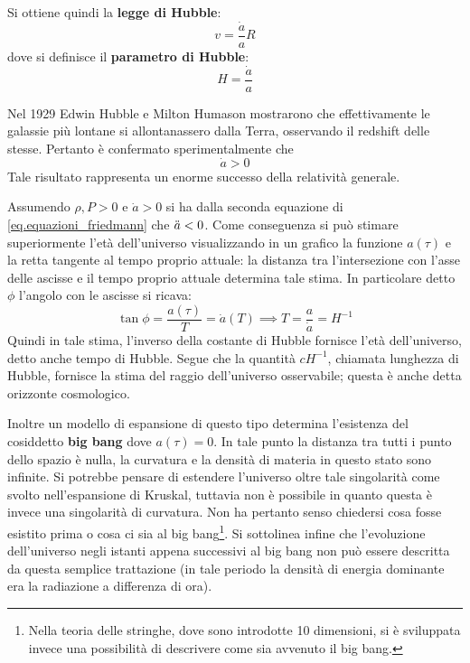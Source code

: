 Si ottiene quindi la \textbf{legge di Hubble}:
\begin{equation}
    v = \frac{\Dot{a}}{a} R
    \label{eq.legge_hubble}
\end{equation}
dove si definisce il \textbf{parametro di Hubble}:
\begin{equation*}
    H=  \frac{\Dot{a}}{a}
\end{equation*}

Nel 1929 Edwin Hubble e Milton Humason mostrarono che effettivamente le galassie più lontane si allontanassero dalla Terra, osservando il redshift delle stesse. Pertanto è confermato sperimentalmente che
\begin{equation*}
    \Dot{a} > 0
\end{equation*}
Tale risultato rappresenta un enorme successo della relatività generale.

Assumendo $\rho, P >0$ e $\Dot{a}>0$ si ha dalla seconda equazione di \ref{eq.equazioni_friedmann} che $\Ddot{a}<0$. Come conseguenza si può stimare superiormente l'età dell'universo visualizzando in un grafico la funzione $a(\tau)$ e la retta tangente al tempo proprio attuale: la distanza tra l'intersezione con l'asse delle ascisse e il tempo proprio attuale determina tale stima.
In particolare detto $\phi$ l'angolo con le ascisse si ricava:
\begin{equation*}
    \tan \phi = \frac{a(\tau)}{T}= \Dot{a}(T) \implies T= \frac{a}{\dot{a}} = H^{-1}
\end{equation*}
Quindi in tale stima, l'inverso della costante di Hubble fornisce l'età dell'universo, detto anche tempo di Hubble. Segue che la quantità $cH^{-1}$, chiamata lunghezza di Hubble, fornisce la stima del raggio dell'universo osservabile; questa è anche detta orizzonte cosmologico.

Inoltre un modello di espansione di questo tipo determina l'esistenza del cosiddetto \textbf{big bang} dove $a(\tau)=0$. In tale punto la distanza tra tutti i punto dello spazio è nulla, la curvatura e la densità di materia in questo stato sono infinite. Si potrebbe pensare di estendere l'universo oltre tale singolarità come svolto nell'espansione di Kruskal, tuttavia non è possibile in quanto questa è invece una singolarità di curvatura. Non ha pertanto senso chiedersi cosa fosse esistito prima o cosa ci sia  al big bang\footnote{Nella teoria delle stringhe, dove sono introdotte 10 dimensioni, si è sviluppata invece una possibilità di descrivere come sia avvenuto il big bang.}. 
Si sottolinea infine che l'evoluzione dell'universo negli istanti appena successivi al big bang non può essere descritta da questa semplice trattazione (in tale periodo la densità di energia dominante era la radiazione a differenza di ora). 

